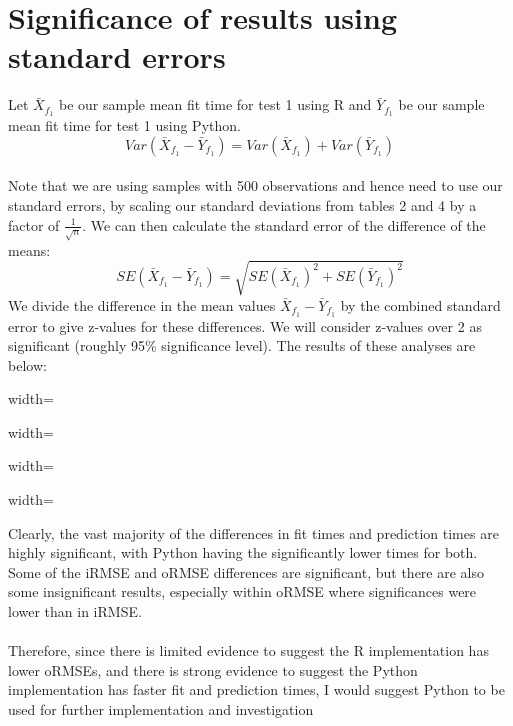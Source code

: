 \documentclass[11pt,twoside,a4paper]{article}
\begin{document}
\section{Significance of results using standard errors}
Let $\bar{X}_{f_1}$ be our sample mean fit time for test 1 using R and $\bar{Y}_{f_1}$ be our sample mean fit time for test 1 using Python.
$$
Var(\bar{X}_{f_1}-\bar{Y}_{f_1}) = Var(\bar{X}_{f_1}) + Var( \bar{Y}_{f_1})
$$\\
Note that we are using samples with 500 observations and hence need to use our standard errors, by scaling our standard deviations from tables 2 and 4 by a factor of $\frac{1}{\sqrt{n}}$. We can then calculate the standard error of the difference of the means:
$$
SE(\bar{X}_{f_1}-\bar{Y}_{f_1}) = \sqrt{SE(\bar{X}_{f_1})^2 + SE(\bar{Y}_{f_1})^2}
$$
We divide the difference in the mean values $\bar{X}_{f_1}-\bar{Y}_{f_1}$ by the combined standard error to give z-values for these differences. We will consider z-values over 2 as significant (roughly 95\% significance level). The results of these analyses are below:
\begin{table}[htbp]
\centering
\caption{Fit and prediction standard errors}
\label{tab:fit_pred_ses}
\begin{adjustbox}{width=\textwidth}

\end{adjustbox}
\end{table}
\begin{table}[htbp]
\centering
\caption{iRMSE and oRMSE standard errors}
\label{tab:rmse_ses}
\begin{adjustbox}{width=\textwidth}

\end{adjustbox}
\end{table}
\begin{table}[htbp]
\centering
\caption{Fit and prediction z-values}
\label{tab:fit_pred_sig}
\begin{adjustbox}{width=\textwidth}

\end{adjustbox}
\end{table}
\begin{table}[htbp]
\centering
\caption{iRMSE and oRMSE z-values}
\label{tab:rmse_sig}
\begin{adjustbox}{width=\textwidth}

\end{adjustbox}
\end{table}
\newpage
Clearly, the vast majority of the differences in fit times and prediction times are highly significant, with Python having the significantly lower times for both. Some of the iRMSE and oRMSE differences are significant, but there are also some insignificant results, especially within oRMSE where significances were lower than in iRMSE.\\
\\
Therefore, since there is limited evidence to suggest the R implementation has lower oRMSEs, and there is strong evidence to suggest the Python implementation has faster fit and prediction times, I would suggest Python to be used for further implementation and investigation
\end{document}
